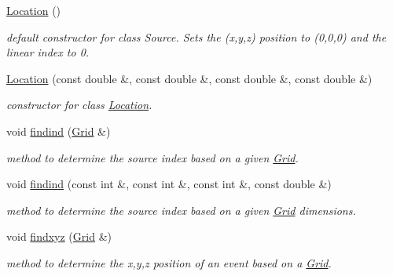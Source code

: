 \begin{DoxyCompactItemize}
\item 
\hypertarget{classlocations_1_1_location_a0893d52bf363811060b99bfcb1f15937}{}\hyperlink{classlocations_1_1_location_a0893d52bf363811060b99bfcb1f15937}{Location} ()\label{classlocations_1_1_location_a0893d52bf363811060b99bfcb1f15937}

\begin{DoxyCompactList}\small\item\em default constructor for class Source. Sets the (x,y,z) position to (0,0,0) and the linear index to 0. \end{DoxyCompactList}\item 
\hyperlink{classlocations_1_1_location_a4ba22525e61db96d14a1beb0e60722a1}{Location} (const double \&, const double \&, const double \&, const double \&)
\begin{DoxyCompactList}\small\item\em constructor for class \hyperlink{classlocations_1_1_location}{Location}. \end{DoxyCompactList}\item 
void \hyperlink{classlocations_1_1_location_a474afde4468d90a3124d202f83598f87}{findind} (\hyperlink{class_grid}{Grid} \&)
\begin{DoxyCompactList}\small\item\em method to determine the source index based on a given \hyperlink{class_grid}{Grid}. \end{DoxyCompactList}\item 
void \hyperlink{classlocations_1_1_location_afd6d2d2f047e15837ab7cc463ec15654}{findind} (const int \&, const int \&, const int \&, const double \&)
\begin{DoxyCompactList}\small\item\em method to determine the source index based on a given \hyperlink{class_grid}{Grid} dimensions. \end{DoxyCompactList}\item 
void \hyperlink{classlocations_1_1_location_abe1541c2a54d0b19cc67213f5e9eead5}{findxyz} (\hyperlink{class_grid}{Grid} \&)
\begin{DoxyCompactList}\small\item\em method to determine the x,y,z position of an event based on a \hyperlink{class_grid}{Grid}. \end{DoxyCompactList}\end{DoxyCompactItemize}
